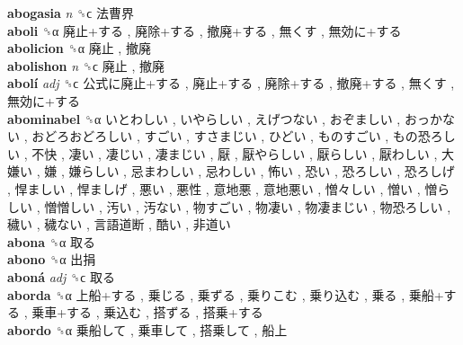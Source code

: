 \textbf{abogasia} \emph{n}  ␝ϲ   法曹界   \\
\textbf{aboli} ␝α   廃止+する ,  廃除+する ,  撤廃+する ,  無くす ,  無効に+する   \\
\textbf{abolicion} ␝α   廃止 ,  撤廃   \\
\textbf{abolishon} \emph{n}  ␝ϲ   廃止 ,  撤廃   \\
\textbf{abolí} \emph{adj}  ␝ϲ   公式に廃止+する ,  廃止+する ,  廃除+する ,  撤廃+する ,  無くす ,  無効に+する   \\
\textbf{abominabel} ␝α   いとわしい ,  いやらしい ,  えげつない ,  おぞましい ,  おっかない ,  おどろおどろしい ,  すごい ,  すさまじい ,  ひどい ,  ものすごい ,  もの恐ろしい ,  不快 ,  凄い ,  凄じい ,  凄まじい ,  厭 ,  厭やらしい ,  厭らしい ,  厭わしい ,  大嫌い ,  嫌 ,  嫌らしい ,  忌まわしい ,  忌わしい ,  怖い ,  恐い ,  恐ろしい ,  恐ろしげ ,  悍ましい ,  悍ましげ ,  悪い ,  悪性 ,  意地悪 ,  意地悪い ,  憎々しい ,  憎い ,  憎らしい ,  憎憎しい ,  汚い ,  汚ない ,  物すごい ,  物凄い ,  物凄まじい ,  物恐ろしい ,  穢い ,  穢ない ,  言語道断 ,  酷い ,  非道い   \\
\textbf{abona} ␝α   取る   \\
\textbf{abono} ␝α   出捐   \\
\textbf{aboná} \emph{adj}  ␝ϲ   取る   \\
\textbf{aborda} ␝α   上船+する ,  乗じる ,  乗ずる ,  乗りこむ ,  乗り込む ,  乗る ,  乗船+する ,  乗車+する ,  乗込む ,  搭ずる ,  搭乗+する   \\
\textbf{abordo} ␝α   乗船して ,  乗車して ,  搭乗して ,  船上   \\
